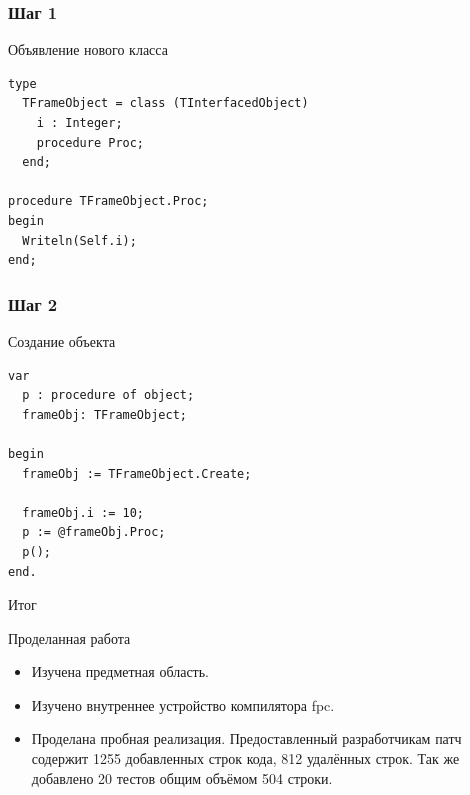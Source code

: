 \documentclass[roman,12pt]{beamer}
\begin{document}
\begin{frame}[fragile]
  \frametitle{Шаг 1}
 \begin{block}{Объявление нового класса}
   \begin{lstlisting}
type
  TFrameObject = class (TInterfacedObject)
    i : Integer;
    procedure Proc;
  end;

procedure TFrameObject.Proc;
begin
  Writeln(Self.i);
end;
   \end{lstlisting}
 \end{block} 
\end{frame}

\begin{frame}[fragile]
  \frametitle{Шаг 2}
 \begin{block}{Создание объекта}
   \begin{lstlisting}
var
  p : procedure of object;
  frameObj: TFrameObject;

begin
  frameObj := TFrameObject.Create;

  frameObj.i := 10;
  p := @frameObj.Proc;
  p();
end.
   \end{lstlisting}
 \end{block} 
\end{frame}

\begin{frame}{Итог}
   \begin{block}{Проделанная работа}
     \begin{itemize}
     \item Изучена предметная область.
     \item Изучено внутреннее устройство компилятора fpc.
     \item Проделана пробная реализация. Предоставленный разработчикам
       патч содержит 1255 добавленных строк кода, 812 удалённых строк.
Так же добавлено 20 тестов общим объёмом 504 строки.
     \end{itemize}
   \end{block} 
\end{frame}
\end{document}
